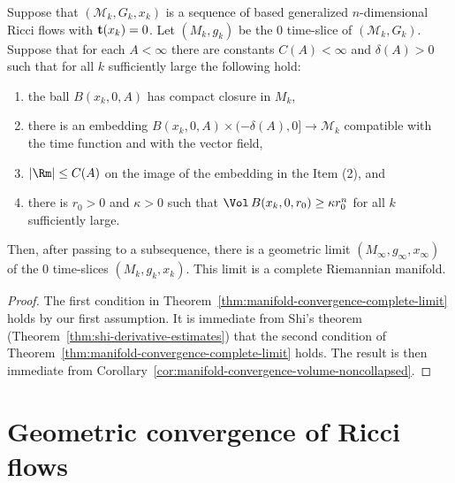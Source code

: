 \begin{theorem}\label{thm:ricci-flow-slice-convergence}
\notready
\label{sliceconv}

Suppose that $({\mathcal M}_k,G_k,x_k)$ is a sequence of based
generalized $n$-dimensional Ricci flows with ${\bf t}(x_k)=0$. Let
$(M_k,g_k)$ be the $0$ time-slice of $({\mathcal M}_k,G_k)$. Suppose
that for each $A<\infty$ there are constants $C(A)<\infty$ and
$\delta(A)>0$ such that for all $k$ sufficiently large the following
hold:
\begin{enumerate}
\item[(1)] the ball $B(x_k,0,A)$ has compact closure in $M_k$,
\item[(2)] there is an embedding $B(x_k,0,A)\times (-\delta(A),0]\to {\mathcal M}_k$ compatible with
the time function and with the vector field, \item[(3)]   $|\Rm|\le C(A)$
on the image of the embedding in the Item (2), and \item[(4)] there is $r_0>0$
and $\kappa>0$ such that $\Vol\,B(x_k,0,r_0)\ge \kappa r_0^n$ for all $k$
sufficiently large.
\end{enumerate} Then, after passing to a
subsequence, there is a geometric limit
$(M_\infty,g_\infty,x_\infty)$ of the $0$ time-slices
$(M_k,g_k,x_k)$. This limit is a complete Riemannian manifold.
\end{theorem}


\begin{proof}
\sketch
{}
The first condition in Theorem~\ref{thm:manifold-convergence-complete-limit} holds by our first
assumption. It is immediate from Shi's theorem (Theorem~\ref{thm:shi-derivative-estimates})
that the second condition of Theorem~\ref{thm:manifold-convergence-complete-limit} holds. The result
is then immediate from Corollary~\ref{cor:manifold-convergence-volume-noncollapsed}.
\end{proof}


\section{Geometric convergence of Ricci flows}




